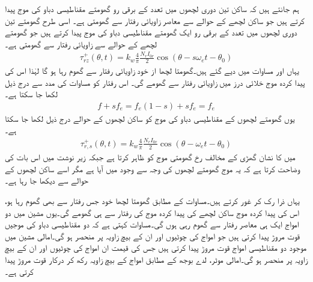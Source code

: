 ہم جانتے ہیں کہ ساکن تین دوری لچھوں میں  تعدد کے برقی رو   گھومتے مقناطیسی دباو کی موج پیدا کرتے ہیں جو ساکن لچھے کے حوالے سے   معاصر زاویائی رفتار سے گھومتی ہے۔ اسی طرح گھومتے تین دوری لچھوں میں  تعدد کے برقی رو ایک گھومتے مقناطیسی دباو کی موج  پیدا کرتے ہیں جو گھومتے لچھے کے حوالے سے   زاویائی رفتار سے گھومتی ہے۔
\begin{align}
\tau_{rz}^+(\theta,t)=k_w \frac{4}{\pi} \frac{N_r I_{0r}}{2} \cos \left(\theta-s \omega_e t -\theta_0 \right)
\end{align}
یہاں   اور  مساوات  میں دیے گئے ہیں۔گھومتا لچھا از خود  زاویائی رفتار سے گھوم رہا ہو گا لہٰذا اس کی پیدا کردہ  موج خلائی درز  میں  زاویائی رفتار سے گھومے گی۔ اس رفتار کو مساوات   کی مدد سے درج ذیل لکھا جا سکتا ہے۔
\begin{align}
f+s f_e= f_e (1-s)+ s f_e=f_e
\end{align}
یوں  گھومتے لچھوں کے مقناطیسی دباو کی موج کو ساکن لچھوں کے حوالے درج ذیل لکھا جا سکتا ہے۔
\begin{align}\label{مساوات_امالی_گھومتے_حصے_کی_موج}
\tau_{r,s}^+(\theta,t)=k_w \frac{4}{\pi} \frac{N_r I_{0r}}{2} \cos \left(\theta-\omega_e t -\theta_0 \right)
\end{align}
 میں  کا نشان گھڑی کے مخالف رخ گھومتی موج کو ظاہر کرتا ہے جبکہ زیر نوشت  میں  اس بات کی وضاحت کرتا ہے کہ یہ موج گھومتے لچھوں کی وجہ سے وجود میں آیا ہے مگر اسے ساکن لچھوں کے حوالے سے دیکھا جا رہا ہے۔

یہاں ذرا رک کر غور کرتے ہیں۔مساوات   کے مطابق گھومتا لچھا خود جس  رفتار سے بھی  گھوم رہا ہو، اس کی پیدا کردہ  موج ساکن لچھے کی پیدا کردہ موج کی رفتار سے ہی گھومے گی۔یوں  مشین میں دو امواج ایک ہی معاصر رفتار سے گھوم رہی ہوں گی۔مساوات   کہتی ہے کہ دو مقناطیسی دباو کی موجیں قوت مروڑ  پیدا کرتی ہیں جو امواج کی چوٹیوں اور ان کے بیچ  زاویہ پر منحصر ہو گی۔امالی مشین میں موجود دو مقناطیسی امواج قوت مروڑ  پیدا کرتی ہیں جس کی قیمت ان  امواج کی چوٹیوں اور ان  کے بیچ زاویہ پر منحصر ہو گی۔امالی موٹر،  لدے بوجھ کے مطابق امواج کے بیچ زاویہ رکھ کر درکار  قوت مروڑ پیدا کرتی ہے۔


